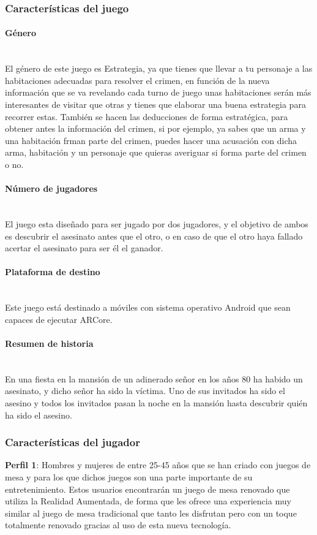\subsubsection{Características del juego}

\paragraph{Género}\mbox{}\\
El género de este juego es Estrategia, ya que tienes que llevar a tu personaje a las habitaciones adecuadas para resolver el crimen, en función de la nueva información que se va revelando cada turno de juego unas habitaciones serán más interesantes de visitar que otras y tienes que elaborar una buena estrategia para recorrer estas. También se hacen las deducciones de forma estratégica, para obtener antes la información del crimen, si por ejemplo, ya sabes que un arma y una habitación frman parte del crimen, puedes hacer una acusación con dicha arma, habitación y un personaje que quieras averiguar si forma parte del crimen o no.

\paragraph{Número de jugadores}\mbox{}\\
El juego esta diseñado para ser jugado por dos jugadores, y el objetivo de ambos es descubrir el asesinato antes que el otro, o en caso de que el otro haya fallado acertar el asesinato para ser él el ganador.

\paragraph{Plataforma de destino}\mbox{}\\
Este juego está destinado a móviles con sistema operativo Android que sean capaces de ejecutar ARCore.

\paragraph{Resumen de historia}\mbox{}\\
En una fiesta en la mansión de un adinerado señor en los años 80 ha habido un asesinato, y dicho señor ha sido la víctima. Uno de sus invitados ha sido el asesino y todos los invitados pasan la noche en la mansión hasta descubrir quién ha sido el asesino.

\subsubsection{Características del jugador}
\textbf{Perfil 1}: Hombres y mujeres de entre 25-45 años que se han criado con juegos de mesa y para los que dichos juegos son una parte importante de su entretenimiento. Estos usuarios encontrarán un juego de mesa renovado que utiliza la Realidad Aumentada, de forma que les ofrece una experiencia muy similar al juego de mesa tradicional que tanto les disfrutan pero con un toque totalmente renovado gracias al uso de esta nueva tecnología.\\

